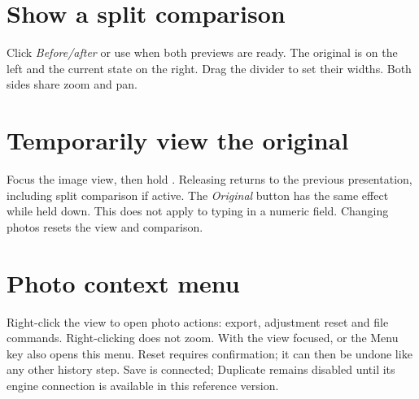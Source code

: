 \section{Show a split comparison}
Click \emph{Before/after} or use  when both previews
are ready. The original is on the left and the current state on the right.
Drag the divider to set their widths. Both sides share zoom and pan.

\section{Temporarily view the original}
Focus the image view, then hold . Releasing returns to the
previous presentation, including split comparison if active. The \emph{Original}
button has the same effect while held down. This does not apply to typing in
a numeric field. Changing photos resets the view and comparison.


\section{Photo context menu}
Right-click the view to open photo actions: export, adjustment reset and file
commands. Right-clicking does not zoom. With the view focused,
 or the Menu key also opens this menu.
Reset requires confirmation; it can then be undone like any other history step.
Save is connected; Duplicate remains disabled until its engine connection
is available in this reference version.
